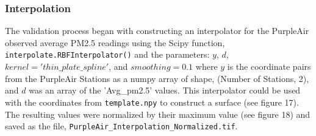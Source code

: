 \documentclass[article,12pt]{article}
\numberwithin{equation}{section}
\begin{document}
\subsubsection{Interpolation} 

The validation process began with constructing an interpolator for the PurpleAir observed average PM2.5 readings using the Scipy function, \texttt{interpolate.RBFInterpolator()} and the parameters: $y$, $d$, $kernel='thin\_plate\_spline'$, and $smoothing=0.1$ where $y$ is the coordinate pairs from the PurpleAir Stations as a numpy array of shape, (Number of Stations, 2), and $d$ was an array of the 'Avg\_pm2.5' values. This interpolator could be used with the coordinates from \texttt{template.npy} to construct a surface (see figure 17). The resulting values were normalized by their maximum value (see figure 18) and saved as the file, \texttt{PurpleAir\_Interpolation\_Normalized.tif}.

\vspace{.35in}

\begin{adjustwidth}{-.88in}{-.88in}
	\begin{center}
		\\
		
	\end{center}
\end{adjustwidth}

\begin{adjustwidth}{-.88in}{-.88in}
	\begin{center}
		\\
		
	\end{center}
\end{adjustwidth}
\end{document}
